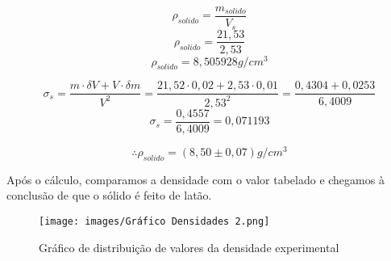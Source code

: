 \[\rho_{solido} = \frac{m_{solido}}{V_s} \]
\[\rho_{solido} = \frac{21,53}{2,53} \]
\[\rho_{solido} = 8,505928 g/cm^3 \]

\[ \sigma_s = \frac{m \cdot \delta V + V \cdot \delta m}{V^2} = \frac{21,52 \cdot 0,02 + 2,53 \cdot 0,01}{2,53^2} = \frac{0,4304 + 0,0253}{6,4009}\]
\[ \sigma_s = \frac{0,4557}{6,4009} = 0,071193\]

\[\therefore \rho_{solido} = (8,50 \pm 0,07) g/cm^3 \]

Após o cálculo, comparamos a densidade com o valor tabelado e chegamos à conclusão de que o sólido é feito de latão.

\begin{figure}[H]
    \centering
    \texttt{[image: images/Gráfico Densidades 2.png]}
    \caption{Gráfico de distribuição de valores da densidade experimental }
\end{figure}